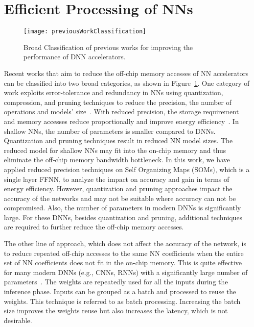 \section{Efficient Processing of NNs}
\begin{figure}[!htb]
	\centering
	\captionsetup{font=sf}
	\texttt{[image: previousWorkClassification]}
	\caption{Broad Classification of previous works for improving the performance of DNN accelerators.}
	\label{fig:previousWorkClassification}
\end{figure}
Recent works that aim to reduce the off-chip memory accesses of NN accelerators can be classified into two broad categories, as shown in Figure~\ref{fig:previousWorkClassification}. One category of work exploits error-tolerance and redundancy in NNs using quantization, compression, and pruning techniques to reduce the precision, the number of operations and models' size~\cite{ferreira2016fpga,wang2018c,chang2015recurrent,han2017ese,lee2016fpga}. With reduced precision, the storage requirement and memory accesses reduce proportionally and improve energy efficiency~\cite{sze2017efficient}. In shallow NNs, the number of parameters is smaller compared to DNNs. Quantization and pruning techniques result in reduced NN model sizes. The reduced model for shallow NNs may fit into the on-chip memory and thus eliminate the off-chip memory bandwidth bottleneck. In this work, we have applied reduced precision techniques on Self Organizing Maps (SOMs), which is a single layer FFNN, to analyze the impact on accuracy and gain in terms of energy efficiency. However, quantization and pruning approaches impact the accuracy of the networks and may not be suitable where accuracy can not be compromised. Also, the number of parameters in modern DNNs is significantly large. For these DNNs, besides quantization and pruning, additional techniques are required to further reduce the off-chip memory accesses.

The other line of approach, which does not affect the accuracy of the network, is to reduce repeated off-chip accesses to the same NN coefficients when the entire set of NN coefficients does not fit in the on-chip memory. This is quite effective for many modern DNNs (e.g., CNNs, RNNs) with a significantly large number of parameters~\cite{zhang2015optimizing,Li2018SmartShuttleOO,que2019efficient,park2020time}. The weights are repeatedly used for all the inputs during the inference phase. Inputs can be grouped as a batch and processed to reuse the weights. This technique is referred to as batch processing. Increasing the batch size improves the weights reuse but also increases the latency, which is not desirable. 

